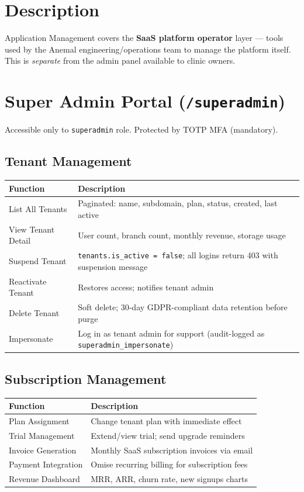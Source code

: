 \documentclass[12pt,a4paper]{report}
\begin{document}
\section{Description}

Application Management covers the \textbf{SaaS platform operator} layer --- tools used by the Anemal engineering/operations team to manage the platform itself. This is \emph{separate} from the admin panel available to clinic owners.

\section{Super Admin Portal (\texttt{/superadmin})}

Accessible only to \texttt{superadmin} role. Protected by TOTP MFA (mandatory).

\subsection{Tenant Management}

\begin{longtable}{L{4cm} L{10cm}}
\toprule
\textbf{Function} & \textbf{Description} \\\midrule\endhead\bottomrule\endfoot
List All Tenants   & Paginated: name, subdomain, plan, status, created, last active \\
View Tenant Detail & User count, branch count, monthly revenue, storage usage \\
Suspend Tenant     & \texttt{tenants.is\_active = false}; all logins return 403 with suspension message \\
Reactivate Tenant  & Restores access; notifies tenant admin \\
Delete Tenant      & Soft delete; 30-day GDPR-compliant data retention before purge \\
Impersonate        & Log in as tenant admin for support (audit-logged as \texttt{superadmin\_impersonate}) \\
\end{longtable}

\subsection{Subscription Management}

\begin{longtable}{L{4cm} L{10cm}}
\toprule
\textbf{Function} & \textbf{Description} \\\midrule\endhead\bottomrule\endfoot
Plan Assignment    & Change tenant plan with immediate effect \\
Trial Management   & Extend/view trial; send upgrade reminders \\
Invoice Generation & Monthly SaaS subscription invoices via email \\
Payment Integration & Omise recurring billing for subscription fees \\
Revenue Dashboard  & MRR, ARR, churn rate, new signups charts \\
\end{longtable}
\end{document}
